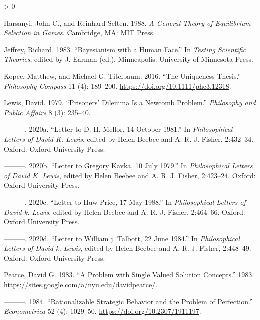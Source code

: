 \documentclass[
  12pt,
]{article}
\newlength{\cslhangindent}
\newenvironment{CSLReferences}[2] %
 {%
  \setlength{\parindent}{0pt}
  \ifodd #1 \everypar{\setlength{\hangindent}{\cslhangindent}}\ignorespaces\fi
  \ifnum #2 > 0
  \setlength{\parskip}{#2\baselineskip}
  \fi
 }%
 {}
\begin{document}
\begin{CSLReferences}{1}{0}
\leavevmode\hypertarget{ref-HarsanyiSelten1988}{}%
Harsanyi, John C., and Reinhard Selten. 1988. \emph{A General Theory of
Equilibrium Selection in Games}. Cambridge, MA: {MIT} Press.

\leavevmode\hypertarget{ref-Jeffrey1983}{}%
Jeffrey, Richard. 1983. {``Bayesianism with a Human Face.''} In
\emph{Testing Scientific Theories}, edited by J. Earman (ed.).
Minneapolis: University of Minnesota Press.

\leavevmode\hypertarget{ref-KopecTitelbaum2016}{}%
Kopec, Matthew, and Michael G. Titelbaum. 2016. {``The Uniqueness
Thesis.''} \emph{Philosophy Compass} 11 (4): 189--200.
\url{https://doi.org/10.1111/phc3.12318}.

\leavevmode\hypertarget{ref-Lewis1979e}{}%
Lewis, David. 1979. {``Prisoners' Dilemma Is a {N}ewcomb Problem.''}
\emph{Philosophy and Public Affairs} 8 (3): 235--40.

\leavevmode\hypertarget{ref-Lewis-Mellor-14101981}{}%
---------. 2020a. {``Letter to {D}. H. Mellor, 14 October 1981.''} In
\emph{Philosophical Letters of David {K}. Lewis}, edited by Helen Beebee
and A. R. J. Fisher, 2:432--34. Oxford: Oxford University Press.

\leavevmode\hypertarget{ref-Lewis-Kavka-10071979}{}%
---------. 2020b. {``Letter to Gregory Kavka, 10 July 1979.''} In
\emph{Philosophical Letters of David {K}. Lewis}, edited by Helen Beebee
and A. R. J. Fisher, 2:423--24. Oxford: Oxford University Press.

\leavevmode\hypertarget{ref-Lewis-Price-17051988}{}%
---------. 2020c. {``Letter to Huw Price, 17 May 1988.''} In
\emph{Philosophical Letters of David k. Lewis}, edited by Helen Beebee
and A. R. J. Fisher, 2:464--66. Oxford: Oxford University Press.

\leavevmode\hypertarget{ref-Lewis-Talbott-22061984}{}%
---------. 2020d. {``Letter to William j. Talbott, 22 June 1984.''} In
\emph{Philosophical Letters of David k. Lewis}, edited by Helen Beebee
and A. R. J. Fisher, 2:448--49. Oxford: Oxford University Press.

\leavevmode\hypertarget{ref-Pearce1983}{}%
Pearce, David G. 1983. {``A Problem with Single Valued Solution
Concepts.''} 1983.
\url{https://sites.google.com/a/nyu.edu/davidpearce/}.

\leavevmode\hypertarget{ref-Pearce1984}{}%
---------. 1984. {``Rationalizable Strategic Behavior and the Problem of
Perfection.''} \emph{Econometrica} 52 (4): 1029--50.
\url{https://doi.org/10.2307/1911197}.


\end{CSLReferences}
\end{document}

